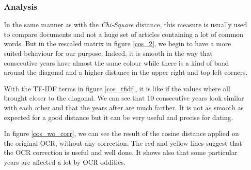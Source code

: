 \subsubsection{Analysis}

In the same manner as with the \emph{Chi-Square} distance, this measure is usually used to compare documents and not a huge set of articles containing a lot of common words. But in the rescaled matrix in figure \ref{cos_2}, we begin to have a more suited behaviour for our purpose. Indeed, it is smooth in the way that consecutive years have almost the same colour while there is a kind of band around the diagonal and a higher distance in the upper right and top left corners.

With the TF-IDF terms in figure \ref{cos_tfidf}, it is like if the values where all brought closer to the diagonal. We can see that 10 consecutive years look similar with each other and that the years after are much farther. It is not as smooth as expected for a good distance but it can be very useful and precise for dating.

In figure \ref{cos_wo_corr}, we can see the result of the cosine distance applied on the original OCR, without any correction. The red and yellow lines suggest that the OCR correction is useful and well done. It shows also that some particular years are affected a lot by OCR oddities.